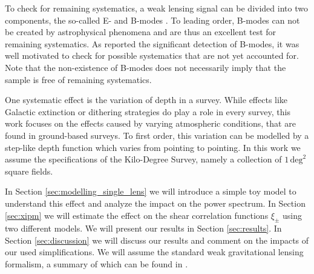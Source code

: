 To check for remaining systematics, a weak lensing signal can be divided into two components, the so-called E- and B-modes \citep{2002ApJ...568...20C,2002A&A...389..729S}. To leading order, B-modes can not be created by astrophysical phenomena and are thus an excellent test for remaining systematics. As \citet{2017MNRAS.465.1454H} reported the significant detection of B-modes, it was well motivated to check for possible systematics that are not yet accounted for. Note that the non-existence of B-modes does not necessarily imply that the sample is free of remaining systematics.

One systematic effect is the variation of depth in a survey. While effects like Galactic extinction or dithering strategies do play a role in every survey, this work focuses on the effects caused by varying atmospheric conditions, that are found in ground-based surveys. To first order, this variation can be modelled by a step-like depth function which varies from pointing to pointing. In this work we assume the specifications of the Kilo-Degree Survey, namely a collection of $1\,\text{deg}^2$ square fields. 

In Section \ref{sec:modelling_single_lens} we will introduce a simple toy model to understand this effect and analyze the impact on the power spectrum. In Section \ref{sec:xipm} we will estimate the effect on the shear correlation functions $\xi_\pm$ using two different models. We will present our results in Section \ref{sec:results}. In Section \ref{sec:discussion} we will discuss our results and comment on the impacts of our used simplifications. We will assume the standard weak gravitational lensing formalism, a summary of which can be found in \citet{2001PhR...340..291B}.

